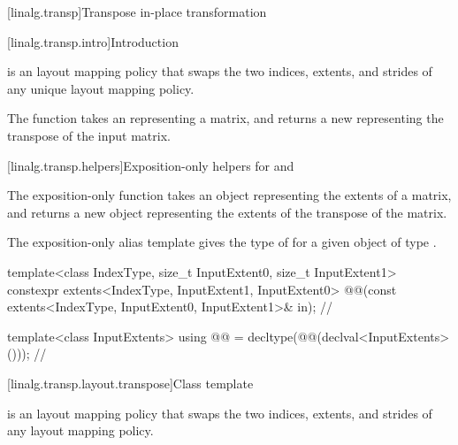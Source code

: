 [linalg.transp]{Transpose in-place transformation}

[linalg.transp.intro]{Introduction}

\pnum
{} is an  layout mapping policy
that swaps the two indices, extents, and strides
of any unique  layout mapping policy.

\pnum
The  function takes an 
representing a matrix, and returns a new 
representing the transpose of the input matrix.

[linalg.transp.helpers]{Exposition-only helpers for  and }

\pnum
The exposition-only  function
takes an  object representing the extents of a matrix,
and returns a new  object
representing the extents of the transpose of the matrix.

\pnum
The exposition-only alias template
gives the type of 
for a given  object  of type .
\begin{itemdecl}
template<class IndexType, size_t InputExtent0, size_t InputExtent1>
  constexpr extents<IndexType, InputExtent1, InputExtent0>
    @@(const extents<IndexType, InputExtent0, InputExtent1>& in);   // \expos
\end{itemdecl}

\begin{itemdescr}
\pnum
\returns
{}
\end{itemdescr}

\begin{codeblock}
template<class InputExtents>
  using @@ =
    decltype(@@(declval<InputExtents>()));        // \expos
\end{codeblock}

[linalg.transp.layout.transpose]{Class template }

\pnum
{} is an  layout mapping policy
that swaps the two indices, extents, and strides
of any  layout mapping policy.

